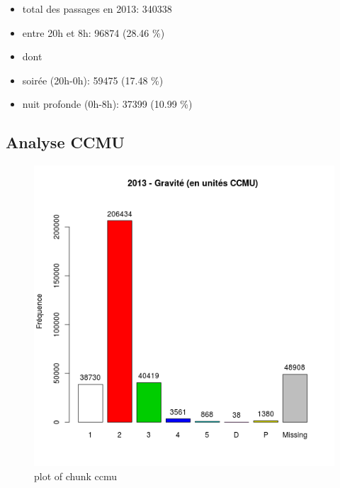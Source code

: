 \begin{itemize}
\itemsep1pt\parskip0pt
\item
  total des passages en 2013: 340338
\item
  entre 20h et 8h: 96874 (28.46 \%)
\item
  dont
\item
  soirée (20h-0h): 59475 (17.48 \%)
\item
  nuit profonde (0h-8h): 37399 (10.99 \%)
\end{itemize}

\subsection{Analyse CCMU}

\begin{Shaded}
\begin{Highlighting}[]
 \NormalTok{, } \NormalTok{, }
     \NormalTok{)}
\end{Highlighting}
\end{Shaded}

\begin{figure}[htbp]
\centering
\includegraphics{figure/ccmu1.png}
\caption{plot of chunk ccmu}
\end{figure}

